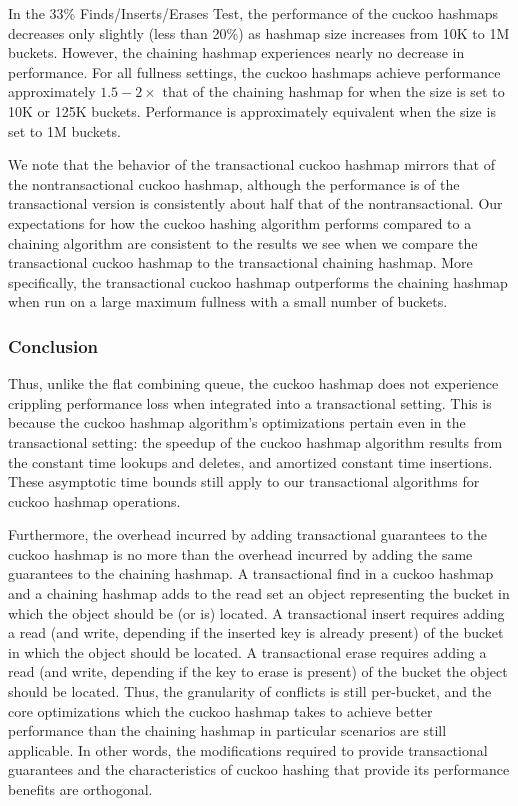 In the 33\% Finds/Inserts/Erases Test, the performance of the cuckoo hashmaps decreases only slightly (less than 20\%) as hashmap size increases from 10K to 1M buckets. However, the chaining hashmap experiences nearly no decrease in performance. For all fullness settings, the cuckoo hashmaps achieve performance approximately $1.5-2\times$ that of the chaining hashmap for when the size is set to 10K or 125K buckets. Performance is approximately equivalent when the size is set to 1M buckets.

We note that the behavior of the transactional cuckoo hashmap mirrors that of the nontransactional cuckoo hashmap, although the performance is of the transactional version is consistently about half that of the nontransactional. Our expectations for how the cuckoo hashing algorithm performs compared to a chaining algorithm are consistent to the results we see when we compare the transactional cuckoo hashmap to the transactional chaining hashmap.
More specifically, the transactional cuckoo hashmap outperforms the chaining hashmap when run on a large maximum fullness with a small number of buckets. 

\subsubsection{Conclusion}

Thus, unlike the flat combining queue, the cuckoo hashmap does not experience crippling performance loss when integrated into a transactional setting. This is because the cuckoo hashmap algorithm's optimizations pertain even in the transactional setting: the speedup of the cuckoo hashmap algorithm results from the constant time lookups and deletes, and amortized constant time insertions. These asymptotic time bounds still apply to our transactional algorithms for cuckoo hashmap operations.

Furthermore, the overhead incurred by adding transactional guarantees to the cuckoo hashmap is no more than the overhead incurred by adding the same guarantees to the chaining hashmap. A transactional find in a cuckoo hashmap and a chaining hashmap adds to the read set an object representing the bucket in which the object should be (or is) located.  A transactional insert requires adding a read (and write, depending if the inserted key is already present) of the bucket in which the object should be located. A transactional erase requires adding a read (and write, depending if the key to erase is present) of the bucket the object should be located. Thus, the granularity of conflicts is still per-bucket, and the core optimizations which the cuckoo hashmap takes to achieve better performance than the chaining hashmap in particular scenarios are still applicable. In other words, the modifications required to provide transactional guarantees and the characteristics of cuckoo hashing that provide its performance benefits are orthogonal.
